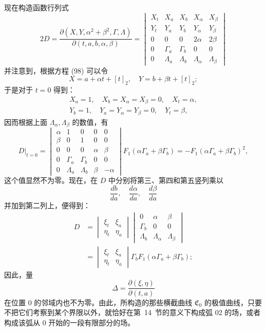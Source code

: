 \documentclass[11pt,a4paper,leqno]{article}
\begin{document}
现在构造函数行列式
\[
2D=\frac{\partial(X,Y,\alpha^2+\beta^2,\Gamma,\Lambda)}{\partial(t,a,b,\alpha,\beta)}
=
\begin{vmatrix}
X_t&X_a&X_b&X_{\alpha}&X_{\beta}\\
Y_t&Y_a&Y_b&Y_{\alpha}&Y_{\beta}\\
0&0&0&2\alpha&2\beta\\
0&\Gamma_a&\Gamma_b&0&0\\
0&\Lambda_a&\Lambda_b&\Lambda_{\alpha}&\Lambda_{\beta}
\end{vmatrix}
\]
并注意到，根据方程 (98) 可以令
\[
X=a+\alpha t+[t]_2,
\quad
Y=b+\beta t+[t]_2;
\]
于是对于 $t=0$ 得到：
\[
\begin{gathered}
X_a=1,
\quad X_b=X_{\alpha}=X_{\beta}=0,
\quad X_t=\alpha,\\
Y_b=1,
\quad Y_a=Y_{\alpha}=Y_{\beta}=0,
\quad Y_t=\beta,
\end{gathered}
\]
因而根据上面 $\Lambda_{\alpha},\Lambda_{\beta}$ 的数值，有
\[
D\big|_{t=0}=
\begin{vmatrix}
\alpha&1&0&0&0\\
\beta&0&1&0&0\\
0&0&0&\alpha&\beta\\
0&\Gamma_a&\Gamma_b&0&0\\
0&\Lambda_a&\Lambda_b&\beta&-\alpha
\end{vmatrix}
F_1(\alpha\Gamma_a+\beta\Gamma_b)
=-F_1(\alpha\Gamma_a+
\beta\Gamma_b)^2,
\]
这个值显然不为零。现在，在 $D$ 中分别将第三、第四和第五竖列乘以
\[
\frac{db}{da},\quad \frac{d\alpha}{da},\quad \frac{d\beta}{da}
\]
并加到第二列上，便得到：
\[
\begin{aligned}
D
&=
\begin{vmatrix}
\xi_t&\xi_a\\
\eta_t&\eta_a
\end{vmatrix}
\begin{vmatrix}
0&\alpha&\beta\\
\Gamma_b&0&0\\
\Lambda_b&\Lambda_{\alpha}&\Lambda_{\beta}
\end{vmatrix}\\
&=
\begin{vmatrix}
\xi_t&\xi_a\\
\eta_t&\eta_a
\end{vmatrix}
\Gamma_bF_1(\alpha\Gamma_a+\beta\Gamma_b);
\end{aligned}
\]
因此，量
\[
\Delta=\frac{\partial(\xi,\eta)}{\partial(t,a)}
\]
在位置 0 的邻域内也不为零。由此，所构造的那些横截曲线 $\mathfrak C_0$ 的极值曲线，只要不把它们考察到某个界限以外，就恰好在第~14~节的意义下构成弧 02 的场，或者构成该弧从 0 开始的一段有限部分的场。
\end{document}

